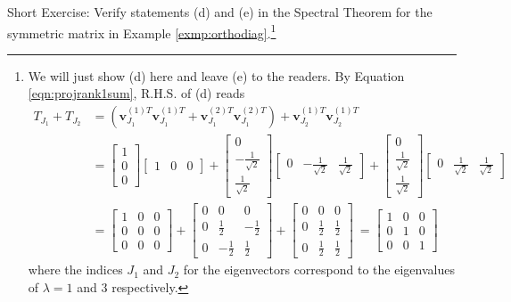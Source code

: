Short Exercise: Verify statements (d) and (e) in the Spectral Theorem for the symmetric matrix in Example \ref{exmp:orthodiag}.\footnote{We will just show (d) here and leave (e) to the readers. By Equation \ref{eqn:projrank1sum}, R.H.S. of (d) reads
\begin{align*}
T_{J_1} + T_{J_2} &= (\textbf{v}_{J_1}^{(1)T}\textbf{v}_{J_1}^{(1)T} + \textbf{v}_{J_1}^{(2)T}\textbf{v}_{J_1}^{(2)T}) + \textbf{v}_{J_2}^{(1)T}\textbf{v}_{J_2}^{(1)T} \\
&= \begin{bmatrix}
1 \\
0 \\
0
\end{bmatrix}
\begin{bmatrix}
1 & 0 & 0
\end{bmatrix} + 
\begin{bmatrix}
0 \\
-\frac{1}{\sqrt{2}} \\
\frac{1}{\sqrt{2}}
\end{bmatrix}
\begin{bmatrix}
0 & -\frac{1}{\sqrt{2}} & \frac{1}{\sqrt{2}}
\end{bmatrix} +
\begin{bmatrix}
0 \\
\frac{1}{\sqrt{2}} \\
\frac{1}{\sqrt{2}}
\end{bmatrix}
\begin{bmatrix}
0 & \frac{1}{\sqrt{2}} & \frac{1}{\sqrt{2}}
\end{bmatrix} \\
&=
\begin{bmatrix}
1 & 0 & 0 \\
0 & 0 & 0 \\
0 & 0 & 0
\end{bmatrix}
+
\begin{bmatrix}
0 & 0 & 0 \\
0 & \frac{1}{2} & -\frac{1}{2} \\
0 & -\frac{1}{2} & \frac{1}{2}
\end{bmatrix}
+
\begin{bmatrix}
0 & 0 & 0 \\
0 & \frac{1}{2} & \frac{1}{2} \\
0 & \frac{1}{2} & \frac{1}{2}
\end{bmatrix}\
=
\begin{bmatrix}
1 & 0 & 0 \\
0 & 1 & 0 \\
0 & 0 & 1
\end{bmatrix}
\end{align*}
where the indices $J_1$ and $J_2$ for the eigenvectors correspond to the eigenvalues of $\lambda = 1$ and $3$ respectively.
}

